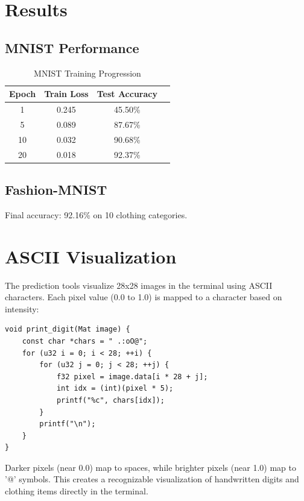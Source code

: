 \documentclass[11pt,a4paper]{article}
\begin{document}
\section{Results}

\subsection{MNIST Performance}

\begin{table}[h]
\centering
\begin{tabular}{cccc}
\toprule
Epoch & Train Loss & Test Accuracy \\
\midrule
1 & 0.245 & 45.50\% \\
5 & 0.089 & 87.67\%  \\
10 & 0.032 & 90.68\%  \\
20 & 0.018 & 92.37\%  \\
\bottomrule
\end{tabular}
\caption{MNIST Training Progression}
\end{table}

\subsection{Fashion-MNIST}

Final accuracy: 92.16\% on 10 clothing categories.

\section{ASCII Visualization}

The prediction tools visualize 28x28 images in the terminal using ASCII characters. Each pixel value (0.0 to 1.0) is mapped to a character based on intensity:

\begin{lstlisting}[caption={ASCII Visualization}]
void print_digit(Mat image) {
    const char *chars = " .:oO@";
    for (u32 i = 0; i < 28; ++i) {
        for (u32 j = 0; j < 28; ++j) {
            f32 pixel = image.data[i * 28 + j];
            int idx = (int)(pixel * 5);
            printf("%c", chars[idx]);
        }
        printf("\n");
    }
}
\end{lstlisting}

Darker pixels (near 0.0) map to spaces, while brighter pixels (near 1.0) map to '@' symbols. This creates a recognizable visualization of handwritten digits and clothing items directly in the terminal.
\end{document}
